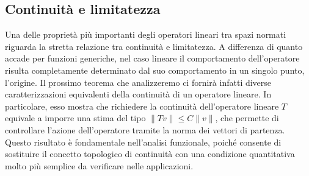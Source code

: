 \documentclass[a4paper,12pt]{report}
\begin{document}
\subsection{Continuità e limitatezza}

Una delle proprietà più importanti degli operatori lineari tra spazi normati riguarda la stretta relazione tra continuità e limitatezza. A differenza di quanto accade per funzioni generiche, nel caso lineare il comportamento dell’operatore risulta completamente determinato dal suo comportamento in un singolo punto, l’origine.
Il prossimo teorema che analizzeremo ci fornirà infatti diverse caratterizzazioni equivalenti della continuità di un operatore lineare. In particolare, esso mostra che richiedere la continuità dell'operatore lineare $T$ equivale a imporre una stima del tipo
$\|T v\|\leq C\|v\|$, che permette di controllare l’azione dell’operatore tramite la norma dei vettori di partenza.
\\Questo risultato è fondamentale nell’analisi funzionale, poiché consente di sostituire il concetto topologico di continuità con una condizione quantitativa molto più semplice da verificare nelle applicazioni.

\newpage
\end{document}
